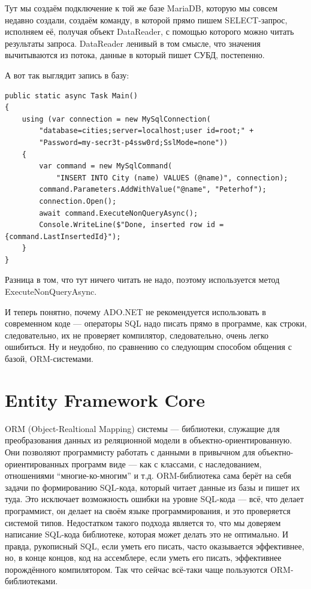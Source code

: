 \documentclass[a5paper]{article}
\begin{document}
Тут мы создаём подключение к той же базе MariaDB, которую мы совсем недавно создали, создаём команду, в которой прямо пишем SELECT-запрос, исполняем её, получая объект DataReader, с помощью которого можно читать результаты запроса. DataReader ленивый в том смысле, что значения вычитываются из потока, данные в который пишет СУБД, постепенно.

А вот так выглядит запись в базу:

\begin{verbatim}
public static async Task Main()
{
    using (var connection = new MySqlConnection(
        "database=cities;server=localhost;user id=root;" +
        "Password=my-secr3t-p4ssw0rd;SslMode=none"))
    {
        var command = new MySqlCommand(
            "INSERT INTO City (name) VALUES (@name)", connection);
        command.Parameters.AddWithValue("@name", "Peterhof");
        connection.Open();
        await command.ExecuteNonQueryAsync();
        Console.WriteLine($"Done, inserted row id = {command.LastInsertedId}");
    }
}
\end{verbatim}

Разница в том, что тут ничего читать не надо, поэтому используется метод ExecuteNonQueryAsync.

И теперь понятно, почему ADO.NET не рекомендуется использовать в современном коде --- операторы SQL надо писать прямо в программе, как строки, следовательно, их не проверяет компилятор, следовательно, очень легко ошибиться. Ну и неудобно, по сравнению со следующим способом общения с базой, ORM-системами.

\section{Entity Framework Core}

ORM (Object-Realtional Mapping) системы --- библиотеки, служащие для преобразования данных из реляционной модели в объектно-ориентированную. Они позволяют программисту работать с данными в привычном для объектно-ориентированных программ виде --- как с классами, с наследованием, отношениями ``многие-ко-многим'' и т.д. ORM-библиотека сама берёт на себя задачи по формированию SQL-кода, который читает данные из базы и пишет их туда. Это исключает возможность ошибки на уровне SQL-кода --- всё, что делает программист, он делает на своём языке программирования, и это проверяется системой типов. Недостатком такого подхода является то, что мы доверяем написание SQL-кода библиотеке, которая может делать это не оптимально. И правда, рукописный SQL, если уметь его писать, часто оказывается эффективнее, но, в конце концов, код на ассемблере, если уметь его писать, эффективнее порождённого компилятором. Так что сейчас всё-таки чаще пользуются ORM-библиотеками.
\end{document}
